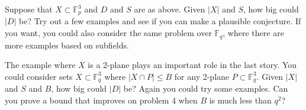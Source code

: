 \documentclass{amsart}
\newcommand{\FF}{\mathbb{F}}
\begin{document}
\vskip10pt

Suppose that $X \subset \FF_p^3$ and $D$ and $S$ are as above.   Given $|X|$ and $S$,  how big could $|D|$ be?  Try out a few examples and see if you can make a plausible conjecture.   If you want,  you could also consider the same problem over $\FF_q$,  where there are more examples based on subfields.

The example where $X$ is a 2-plane plays an important role in the last story.    You could consider sets $X \subset \FF_q^3$ where $|X \cap P| \le B$ for any 2-plane $P \subset \FF_q^3$.   Given $|X|$ and $S$ and $B$, how big could $|D|$ be?  Again you could try some examples.    Can you prove a bound that improves on problem 4 when $B$ is much less than $q^2$?
\end{document}
